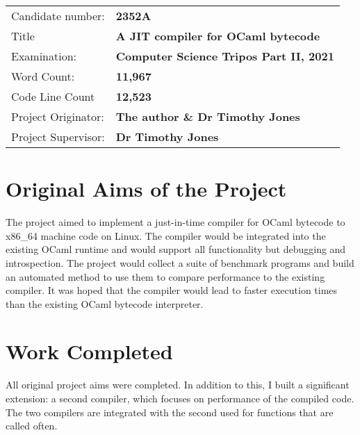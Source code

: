  {\large

  \begin{tabular}{ll}
      Candidate number:   & \textbf{2352A}                                 \\
      Title               & \textbf{A JIT compiler for OCaml bytecode}     \\
      Examination:        & \textbf{Computer Science Tripos Part II, 2021} \\
      Word Count:         & \textbf{11,967\footnotemark}                   \\
      Code Line Count     & \textbf{12,523\footnotemark}                   \\
      Project Originator: & \textbf{The author \& Dr Timothy Jones}        \\
      Project Supervisor: & \textbf{Dr Timothy Jones}                      \\
  \end{tabular}
 }

\section*{Original Aims of the Project}

The project aimed to implement a just-in-time compiler for OCaml bytecode to x86\_64 machine code
on
Linux. The compiler would be integrated into the existing OCaml runtime and would support all
functionality but debugging and introspection. The project would collect a suite of benchmark
programs
and build an automated method to use them to compare performance to the existing compiler. It was
hoped
that the compiler would lead to faster execution times than the existing OCaml bytecode
interpreter.

\section*{Work Completed}

All original project aims were completed. In addition to this, I built a significant
extension: a second compiler, which focuses on performance of the compiled code. The
two compilers are integrated with the second used for functions that are called often.

